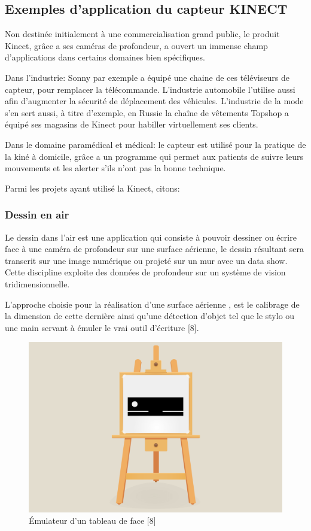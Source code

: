 \documentclass[12pt,a4paper,oneside]{book}
\begin{document}
	\subsection{Exemples d'application du capteur KINECT}
	Non destinée initialement à une commercialisation grand public, le produit Kinect, grâce a ses caméras de profondeur, a ouvert un immense champ d’applications dans certains domaines bien spécifiques.
	
	Dans l’industrie: Sonny par exemple a équipé une chaine de ces téléviseurs de capteur, pour remplacer la télécommande. L'industrie automobile l'utilise aussi afin d’augmenter la sécurité de déplacement des véhicules.
	L'industrie de la mode s'en sert aussi, à titre d'exemple,  en Russie la chaîne de vêtements Topshop a équipé ses magasins de Kinect pour habiller virtuellement ses clients.
	
	Dans le domaine paramédical et médical: le capteur est utilisé pour la pratique de la kiné à domicile, grâce a un programme qui permet aux patients de suivre leurs mouvements et les alerter s'ils n'ont pas la bonne technique.
	
	Parmi les projets ayant utilisé la Kinect, citons:
	
	\subsubsection{Dessin en air}
	Le dessin dans l'air est une application qui consiste à pouvoir dessiner ou écrire face à une caméra de profondeur sur une surface aérienne, le dessin résultant sera transcrit sur une image numérique ou projeté sur un mur avec un data show. Cette discipline exploite des données de profondeur sur un système de vision tridimensionnelle.
	
	L'approche choisie pour la réalisation d'une surface aérienne , est le calibrage de la dimension de cette dernière ainsi qu'une détection d'objet tel que le stylo ou une main servant à émuler le vrai outil d'écriture [8].
	
	\begin{figure}[H]
		\centering
		\includegraphics[scale=0.30]{images/kinect-drawing.png}
		\caption{Émulateur d'un tableau de face \textcolor[rgb]{1.00,0.00,0.00}{[8]}}
		\label{fig}
	\end{figure}
	
\end{document}
